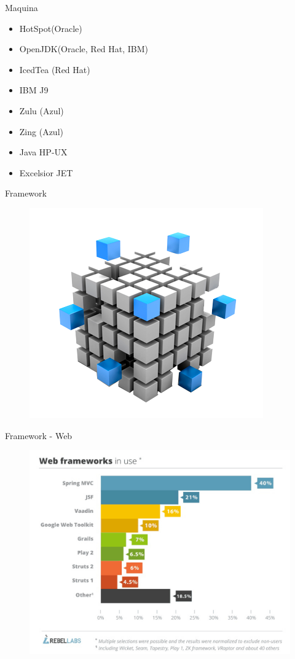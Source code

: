 \documentclass{beamer}
\begin{document}
\begin{frame}{Maquina}
	\begin{itemize}
		\item HotSpot(Oracle)
		\item OpenJDK(Oracle, Red Hat, IBM)
		\item IcedTea (Red Hat)
		\item IBM J9
		\item Zulu (Azul)
		\item Zing (Azul)
		\item Java HP-UX
		\item Excelsior JET
	\end{itemize}
\end{frame}

\begin{frame}{Framework}
	\begin{figure}
		\centering
		\includegraphics[width=0.7\linewidth]{Images/framework}
	\end{figure}
\end{frame}

\begin{frame}{Framework - Web}
	\begin{figure}
		\centering
		\includegraphics[width=0.9\linewidth]{Images/fwweb}
	\end{figure}
\end{frame}
\end{document}
